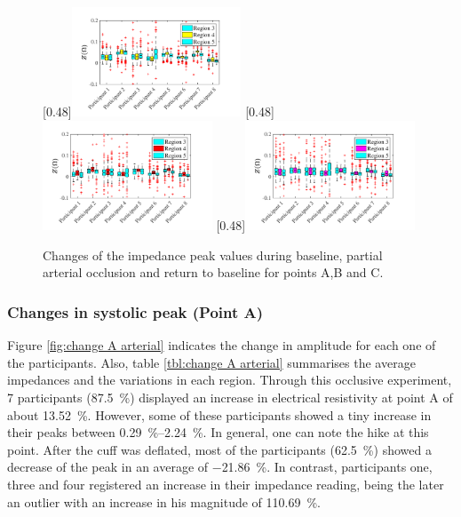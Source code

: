 \begin{figure}
	\null\hfill%
	[0.48\textwidth]{\includegraphics[width=0.45\textwidth, trim={0.5cm 0cm 1.5cm 0 cm}, clip]{figure_apa_5a}}%
	\hfill%
	[0.48\textwidth]{\includegraphics[width=0.45\textwidth, trim={0.5cm 0cm 1.5cm 0 cm}, clip]{figure_apa_5b}}%
	\hfill%
	[0.48\textwidth]{\includegraphics[width=0.45\textwidth, trim={0.5cm 0cm 1.5cm 0 cm}, clip]{figure_apa_5c}}%
	\null%
	\caption{Changes of the impedance peak values during baseline, partial arterial occlusion and return to baseline for points A,B and C.}
	\label{fig:iPG change points arterial}
\end{figure}

\subsubsection{Changes in systolic peak (Point A)}
\label{section apa 2.2.1}
Figure \ref{fig:change A arterial} indicates the change in amplitude for each one of the participants. Also, table \ref{tbl:change A arterial} summarises the average impedances and the variations in each region. Through this occlusive experiment, 7 participants (\SI{87.5}{\percent}) displayed an increase in electrical resistivity at point A of about \SI{13.52}{\percent}. However, some of these participants showed a tiny increase in their peaks between \SIrange{0.29}{2.24}{\percent}. In general, one can note the hike at this point. After the cuff was deflated, most of the participants (\SI{62.5}{\percent}) showed a decrease of the peak in an average of \SI{-21.86}{\percent}.  In contrast, participants one, three and four registered an increase in their impedance reading, being the later an outlier with an increase in his magnitude of \SI{110.69}{\percent}.

